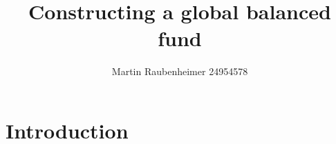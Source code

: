 \documentclass[11pt,preprint]{elsarticle}
\numberwithin{equation}{section}
\numberwithin{figure}{section}
\numberwithin{table}{section}
\begin{document}
\begin{frontmatter}  %

\title{Constructing a global balanced fund}





\author[Add1]{Martin Raubenheimer 24954578}





\address[Add1]{Department of Economics, Stellenbosch University, South
Africa}



\vspace{1cm}





\vspace{0.5cm}

\end{frontmatter}

\setcounter{footnote}{0}



\pagestyle{fancy}
\chead{}
\rhead{}
\lfoot{}
\lhead{}
\cfoot{}


\headsep 35pt %




\section{\texorpdfstring{Introduction
\label{Introduction}}{Introduction }}\label{introduction}
\end{document}
